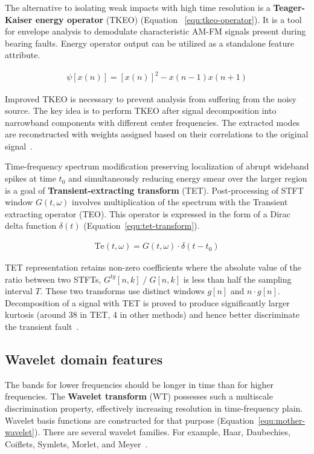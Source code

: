 The alternative to isolating weak impacts with high time resolution is a \textbf{Teager-Kaiser energy operator} (TKEO) (Equation~ \ref{equ:tkeo-operator}). It is a tool for envelope analysis to demodulate characteristic AM-FM signals present during bearing faults. Energy operator output can be utilized as a standalone feature attribute.

\begin{ceqn}\begin{align}
\psi[x(n)] = [x(n)]^2 - x(n - 1)x(n + 1)
\label{equ:tkeo-operator}
\end{align}\end{ceqn}

Improved TKEO is necessary to prevent analysis from suffering from the noisy source. The key idea is to perform TKEO after signal decomposition into narrowband components with different center frequencies. The extracted modes are reconstructed with weights assigned based on their correlations to the original signal~\cite{shi_application_2022}.

Time-frequency spectrum modification preserving localization of abrupt wideband spikes at time $t_0$ and simultaneously reducing energy smear over the larger region is a goal of \textbf{Transient-extracting transform} (TET). Post-processing of STFT window $G(t,\omega)$ involves multiplication of the spectrum with the Transient extracting operator (TEO). This operator is expressed in the form of a Dirac delta function $\delta(t)$ (Equation~\ref{equ:tet-transform}).

\begin{ceqn}\begin{align}
\mathrm{Te}(t,\omega) = G(t,\omega) \cdot  \delta(t - t_0)
\label{equ:tet-transform}
\end{align}\end{ceqn}

TET representation retains non-zero coefficients where the absolute value of the ratio between two STFTs, $G^{tg}[n, k]\;/\;G[n, k]$ is less than half the sampling interval $T$. These two transforms use distinct windows $g[n]$ and $n \cdot g[n]$. Decomposition of a signal with TET is proved to produce significantly larger kurtosis (around 38 in TET, 4 in other methods) and hence better discriminate the transient fault~\cite{yu_concentrated_2020}.

\subsection{Wavelet domain features}
The bands for lower frequencies should be longer in time than for higher frequencies. The \textbf{Wavelet transform} (WT) possesses such a multiscale discrimination property, effectively increasing resolution in time-frequency plain. Wavelet basis functions are constructed for that purpose (Equation~\ref{equ:mother-wavelet}). There are several wavelet families. For example, Haar, Daubechies, Coiflets, Symlets, Morlet, and Meyer~\cite{nandi_condition_2019}.

